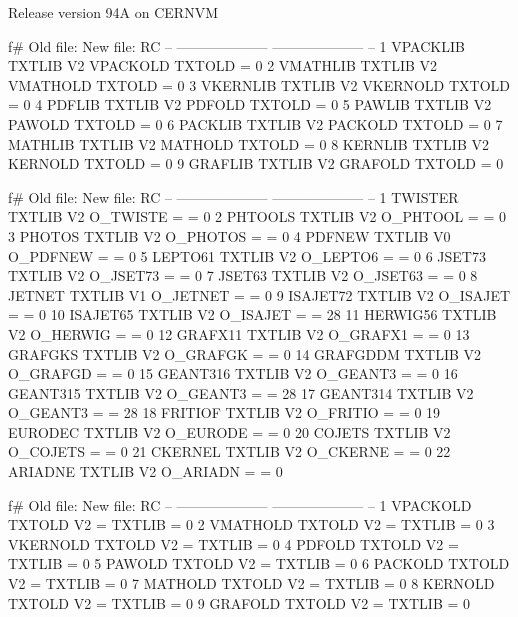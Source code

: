 \begin{XMPt}{Release version 94A on CERNVM}
 
 
 f# Old file:              New file:            RC
 -- --------------------   -------------------- --
 1  VPACKLIB TXTLIB   V2   VPACKOLD TXTOLD   =  0
 2  VMATHLIB TXTLIB   V2   VMATHOLD TXTOLD   =  0
 3  VKERNLIB TXTLIB   V2   VKERNOLD TXTOLD   =  0
 4  PDFLIB   TXTLIB   V2   PDFOLD   TXTOLD   =  0
 5  PAWLIB   TXTLIB   V2   PAWOLD   TXTOLD   =  0
 6  PACKLIB  TXTLIB   V2   PACKOLD  TXTOLD   =  0
 7  MATHLIB  TXTLIB   V2   MATHOLD  TXTOLD   =  0
 8  KERNLIB  TXTLIB   V2   KERNOLD  TXTOLD   =  0
 9  GRAFLIB  TXTLIB   V2   GRAFOLD  TXTOLD   =  0
 
 
 
 f# Old file:              New file:            RC
 -- --------------------   -------------------- --
 1  TWISTER  TXTLIB   V2   O_TWISTE =        =  0
 2  PHTOOLS  TXTLIB   V2   O_PHTOOL =        =  0
 3  PHOTOS   TXTLIB   V2   O_PHOTOS =        =  0
 4  PDFNEW   TXTLIB   V0   O_PDFNEW =        =  0
 5  LEPTO61  TXTLIB   V2   O_LEPTO6 =        =  0
 6  JSET73   TXTLIB   V2   O_JSET73 =        =  0
 7  JSET63   TXTLIB   V2   O_JSET63 =        =  0
 8  JETNET   TXTLIB   V1   O_JETNET =        =  0
 9  ISAJET72 TXTLIB   V2   O_ISAJET =        =  0
 10 ISAJET65 TXTLIB   V2   O_ISAJET =        =  28
 11 HERWIG56 TXTLIB   V2   O_HERWIG =        =  0
 12 GRAFX11  TXTLIB   V2   O_GRAFX1 =        =  0
 13 GRAFGKS  TXTLIB   V2   O_GRAFGK =        =  0
 14 GRAFGDDM TXTLIB   V2   O_GRAFGD =        =  0
 15 GEANT316 TXTLIB   V2   O_GEANT3 =        =  0
 16 GEANT315 TXTLIB   V2   O_GEANT3 =        =  28
 17 GEANT314 TXTLIB   V2   O_GEANT3 =        =  28
 18 FRITIOF  TXTLIB   V2   O_FRITIO =        =  0
 19 EURODEC  TXTLIB   V2   O_EURODE =        =  0
 20 COJETS   TXTLIB   V2   O_COJETS =        =  0
 21 CKERNEL  TXTLIB   V2   O_CKERNE =        =  0
 22 ARIADNE  TXTLIB   V2   O_ARIADN =        =  0
 
 
 
 f# Old file:              New file:            RC
 -- --------------------   -------------------- --
 1  VPACKOLD TXTOLD   V2   =        TXTLIB   =  0
 2  VMATHOLD TXTOLD   V2   =        TXTLIB   =  0
 3  VKERNOLD TXTOLD   V2   =        TXTLIB   =  0
 4  PDFOLD   TXTOLD   V2   =        TXTLIB   =  0
 5  PAWOLD   TXTOLD   V2   =        TXTLIB   =  0
 6  PACKOLD  TXTOLD   V2   =        TXTLIB   =  0
 7  MATHOLD  TXTOLD   V2   =        TXTLIB   =  0
 8  KERNOLD  TXTOLD   V2   =        TXTLIB   =  0
 9  GRAFOLD  TXTOLD   V2   =        TXTLIB   =  0
 
 
 

\end{XMPt}
